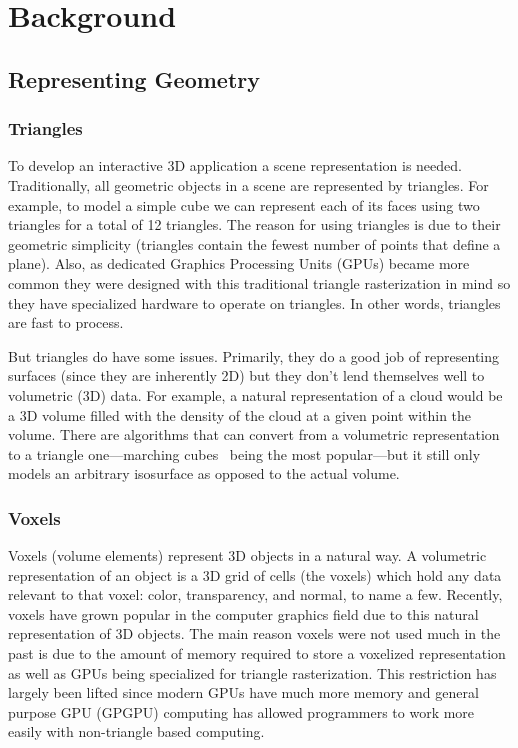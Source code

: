\chapter{Background}

\section{Representing Geometry}
\subsection{Triangles}
To develop an interactive 3D application a scene representation is needed. Traditionally, all geometric objects in a scene are represented by triangles. For example, to model a simple cube we can represent each of its faces using two triangles for a total of 12 triangles. The reason for using triangles is due to their geometric simplicity (triangles contain the fewest number of points that define a plane). Also, as dedicated Graphics Processing Units (GPUs) became more common they were designed with this traditional triangle rasterization in mind so they have specialized hardware to operate on triangles. In other words, triangles are fast to process.

But triangles do have some issues. Primarily, they do a good job of representing surfaces (since they are inherently 2D) but they don't lend themselves well to volumetric (3D) data. For example, a natural representation of a cloud would be a 3D volume filled with the density of the cloud at a given point within the volume. There are algorithms that can convert from a volumetric representation to a triangle one---marching cubes~\cite{lorensen1987marching} being the most popular---but it still only models an arbitrary isosurface as opposed to the actual volume.

\subsection{Voxels}
Voxels (volume elements) represent 3D objects in a natural way. A volumetric representation of an object is a 3D grid of cells (the voxels) which hold any data relevant to that voxel: color, transparency, and normal, to name a few. Recently, voxels have grown popular in the computer graphics field due to this natural representation of 3D objects. The main reason voxels were not used much in the past is due to the amount of memory required to store a voxelized representation as well as GPUs being specialized for triangle rasterization. This restriction has largely been lifted since modern GPUs have much more memory and general purpose GPU (GPGPU) computing has allowed programmers to work more easily with non-triangle based computing.

